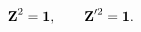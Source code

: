 \begin{equation}
  \mbox{\bf{Z}}^{2} = {\bf 1}, \qquad
  \mbox{\bf{Z}}^{\prime 2} = {\bf 1}.
\label{eq:zz-z'z'}
\end{equation}

